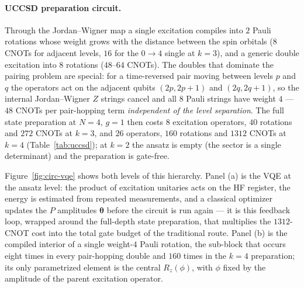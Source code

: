 \documentclass[
  aps,            %
  prc,            %
  reprint,        %
  superscriptaddress,
  floatfix,
  nofootinbib
]{revtex4-2}
\begin{document}
\paragraph{UCCSD preparation circuit.}
Through the Jordan--Wigner map a single excitation compiles into $2$ Pauli
rotations whose weight grows with the distance between the spin orbitals
($8$ CNOTs for adjacent levels, $16$ for the $0\!\to\!4$ single at $k=3$), and a
generic double excitation into $8$ rotations ($48$--$64$ CNOTs).  The doubles
that dominate the pairing problem are special: for a time-reversed pair moving
between levels $p$ and $q$ the operators act on the adjacent qubits
$(2p,2p{+}1)$ and $(2q,2q{+}1)$, so the internal Jordan--Wigner $Z$ strings
cancel and all $8$ Pauli strings have weight $4$ --- $48$ CNOTs per pair-hopping
term \emph{independent of the level separation}.  The full state preparation at
$N=4$, $g=1$ then costs $8$ excitation operators, $40$ rotations and $272$ CNOTs
at $k=3$, and $26$ operators, $160$ rotations and $1312$ CNOTs at $k=4$
(Table~\ref{tab:uccsd}); at $k=2$ the ansatz is empty (the sector is a single
determinant) and the preparation is gate-free.

Figure~\ref{fig:circ-vqe} shows both levels of this hierarchy.  Panel (a) is
the VQE at the ansatz level: the product of excitation unitaries acts on the HF
register, the energy is estimated from repeated measurements, and a classical
optimizer updates the $P$ amplitudes $\boldsymbol\theta$ before the circuit is
run again --- it is this feedback loop, wrapped around the full-depth state
preparation, that multiplies the $1312$-CNOT cost into the total gate budget of
the traditional route.  Panel (b) is the compiled interior of a single
weight-$4$ Pauli rotation, the sub-block that occurs eight times in every
pair-hopping double and $160$ times in the $k=4$ preparation; its only
parametrized element is the central $R_z(\phi)$, with $\phi$ fixed by the
amplitude of the parent excitation operator.
\end{document}
